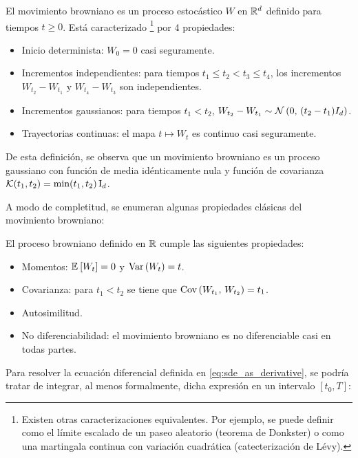 \begin{defn}
    \label{defn:brownian_motion}
    El movimiento browniano es un proceso estocástico $W$ en $\mathbb{R}^d$ definido para tiempos $t\geq 0$. Está caracterizado \footnote{Existen otras caracterizaciones equivalentes. Por ejemplo, se puede definir como el límite escalado de un paseo aleatorio (teorema de Donkster) o como una martingala continua con variación cuadrática (catecterización de Lévy).} por 4 propiedades:
    \begin{itemize}
        \item Inicio determinista: $W_0 = 0$ casi seguramente.
        \item Incrementos independientes: para tiempos $t_1\leq t_2<t_3\leq t_4$, los incrementos $W_{t_2} - W_{t_1}$ y $W_{t_4} - W_{t_3}$ son independientes.
        \item Incrementos gaussianos: para tiempos $t_1<t_2$, $W_{t_2} - W_{t_1}\sim\mathcal{N}\left(0,\,(t_2 - t_1)I_d\right)$.
        \item Trayectorias continuas: el mapa $t\mapsto W_t$ es continuo casi seguramente.
    \end{itemize}
\end{defn}

De esta definición, se observa que un movimiento browniano es un proceso gaussiano con función de media idénticamente nula y función de covarianza $\mathcal{K}(t_1, t_2) = \min(t_1, t_2)\operatorname{I}_{d}$.

A modo de completitud, se enumeran algunas propiedades clásicas del movimiento browniano:

\begin{teo}
    El proceso browniano definido en $\mathbb{R}$ cumple las siguientes propiedades:
    \begin{itemize}
        \item Momentos: $\mathbb{E}_{}\left[W_t\right]=0$ y $\operatorname{Var}\left(W_t\right) = t$.
        \item Covarianza: para $t_1<t_2$ se tiene que $\operatorname{Cov}\left(W_{t_1},\,W_{t_2}\right)=t_1$.
        \item Autosimilitud.
        \item No diferenciabilidad: el movimiento browniano es no diferenciable casi en todas partes.
    \end{itemize}
\end{teo}

Para resolver la ecuación diferencial definida en \eqref{eq:sde_as_derivative}, se podría tratar de integrar, al menos formalmente, dicha expresión en un intervalo $[t_0, T]$:

